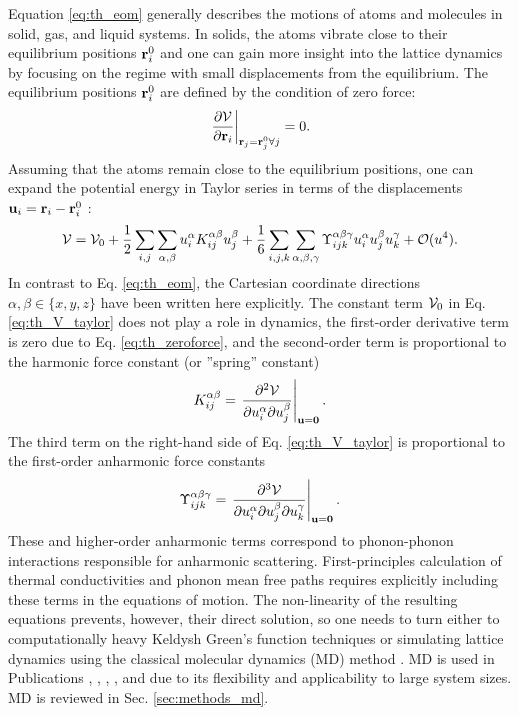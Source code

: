 Equation \eqref{eq:th_eom} generally describes the motions of atoms and molecules in solid, gas, and liquid systems. In solids, the atoms vibrate close to their equilibrium positions $\mathbf{r}_i^0$ and one can gain more insight into the lattice dynamics by focusing on the regime with small displacements from the equilibrium. The equilibrium positions $\mathbf{r}_i^0$ are defined by the condition of zero force:
\begin{equation}
 \left. \frac{\partial \mathcal{V}}{\partial \mathbf{r}_i} \right|_{\mathbf{r}_j=\mathbf{r}_j^0 \forall j} = 0. \label{eq:th_zeroforce}
\end{equation}
Assuming that the atoms remain close to the equilibrium positions, one can expand the potential energy in Taylor series in terms of the displacements $\mathbf{u}_i=\mathbf{r}_i-\mathbf{r}_i^0$ \cite{ziman}:
\begin{equation}
 \ca{V} = \ca{V}_0 + \frac{1}{2} \sum_{i,j} \sum_{\alpha,\beta} u_i^{\alpha} K_{ij}^{\alpha \beta} u_j^{\beta}  + \frac{1}{6} \sum_{i,j,k} \sum_{\alpha,\beta,\gamma} \Upsilon_{ijk}^{\alpha\beta\gamma}  u_i^{\alpha} u_j^{\beta} u_k^{\gamma} + \mathcal{O}(u^4). \label{eq:th_V_taylor} %
\end{equation}
In contrast to Eq. \eqref{eq:th_eom}, the Cartesian coordinate directions $\alpha,\beta \in \{x,y,z\}$ have been written here explicitly. The constant term $\mathcal{V}_0$ in Eq. \eqref{eq:th_V_taylor} does not play a role in dynamics, the first-order derivative term is zero due to Eq. \eqref{eq:th_zeroforce}, and the second-order term is proportional to the harmonic force constant (or ''spring'' constant) \cite{ziman}
\begin{equation}
 K_{ij}^{\alpha\beta} = \left. \frac{\partial^2 \mathcal{V}}{\partial u_i^{\alpha} \partial u_j^{\beta}} \right|_{\mathbf{u}=\mathbf{0}}. \label{eq:th_K_def}
\end{equation}
The third term on the right-hand side of Eq. \eqref{eq:th_V_taylor} is proportional to the first-order anharmonic force constants
\begin{equation}
 \Upsilon_{ijk}^{\alpha\beta\gamma} = \left. \frac{\partial^3 \mathcal{V}}{\partial u_i^{\alpha} \partial u_j^{\beta} \partial u_k^{\gamma}} \right|_{\mathbf{u}=\mathbf{0}}.
\end{equation}
These and higher-order anharmonic terms correspond to phonon-phonon interactions \cite{ziman} responsible for anharmonic scattering. First-principles calculation of thermal conductivities and phonon mean free paths requires explicitly including these terms in the equations of motion. The non-linearity of the resulting equations prevents, however, their direct solution, so one needs to turn either to computationally heavy Keldysh Green's function techniques \cite{wang08} or simulating lattice dynamics using the classical molecular dynamics (MD) method \cite{allentildesley}. MD is used in Publications , , , , and  due to its flexibility and applicability to large system sizes. MD is reviewed in Sec. \ref{sec:methods_md}.

